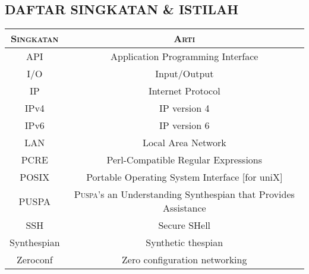 \subsection*{\textcolor{subsectioncolor}{\textsf{DAFTAR SINGKATAN \& ISTILAH}}}

\begin{tabular}{|c|c|}
\hline
{\scshape Singkatan} & {\scshape Arti}\\
\hline
API & Application Programming Interface\\
\hline
I/O & Input/Output\\
\hline
IP & Internet Protocol\\
\hline
IPv4 & IP version 4\\
\hline
IPv6 & IP version 6\\
\hline
LAN & Local Area Network\\
\hline
PCRE & Perl-Compatible Regular Expressions\\
\hline
POSIX & Portable Operating System Interface [for uniX]\\
\hline
PUSPA & {\scshape Puspa}'s an Understanding Synthespian that Provides Assistance\\
\hline
SSH & Secure SHell\\
\hline
Synthespian & Synthetic thespian\\
\hline
Zeroconf & Zero configuration networking\\
\hline
\end{tabular}
